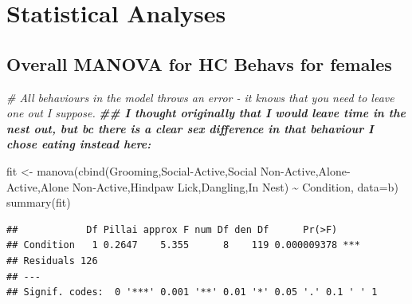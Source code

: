 \documentclass[
]{book}
\newenvironment{Shaded}{\begin{snugshade}}{\end{snugshade}}
\newcommand{\AttributeTok}[1]{\textcolor[rgb]{0.77,0.63,0.00}{#1}}
\newcommand{\CommentTok}[1]{\textcolor[rgb]{0.56,0.35,0.01}{\textit{#1}}}
\newcommand{\DocumentationTok}[1]{\textcolor[rgb]{0.56,0.35,0.01}{\textbf{\textit{#1}}}}
\newcommand{\FunctionTok}[1]{\textcolor[rgb]{0.00,0.00,0.00}{#1}}
\newcommand{\NormalTok}[1]{#1}
\newcommand{\OtherTok}[1]{\textcolor[rgb]{0.56,0.35,0.01}{#1}}
\newcommand{\SpecialCharTok}[1]{\textcolor[rgb]{0.00,0.00,0.00}{#1}}
\newcommand{\StringTok}[1]{\textcolor[rgb]{0.31,0.60,0.02}{#1}}
\begin{document}
\hypertarget{statistical-analyses-1}{%
\section*{Statistical Analyses}\label{statistical-analyses-1}}

\hypertarget{overall-manova-for-hc-behavs-for-females}{%
\subsection{Overall MANOVA for HC Behavs for females}\label{overall-manova-for-hc-behavs-for-females}}

\begin{Shaded}
\begin{Highlighting}[]
\CommentTok{\# All behaviours in the model throws an error {-} it knows that you need to leave one out I suppose. }
\DocumentationTok{\#\# I thought originally that I would leave time in the nest out, but bc there is a clear sex difference in that behaviour I chose eating instead here: }

\NormalTok{fit }\OtherTok{\textless{}{-}} \FunctionTok{manova}\NormalTok{(}\FunctionTok{cbind}\NormalTok{(Grooming,}\StringTok{\textasciigrave{}}\AttributeTok{Social{-}Active}\StringTok{\textasciigrave{}}\NormalTok{,}\StringTok{\textasciigrave{}}\AttributeTok{Social Non{-}Active}\StringTok{\textasciigrave{}}\NormalTok{,}\StringTok{\textasciigrave{}}\AttributeTok{Alone{-}Active}\StringTok{\textasciigrave{}}\NormalTok{,}\StringTok{\textasciigrave{}}\AttributeTok{Alone Non{-}Active}\StringTok{\textasciigrave{}}\NormalTok{,}\StringTok{\textasciigrave{}}\AttributeTok{Hindpaw Lick}\StringTok{\textasciigrave{}}\NormalTok{,}\StringTok{\textasciigrave{}}\AttributeTok{Dangling}\StringTok{\textasciigrave{}}\NormalTok{,}\StringTok{\textasciigrave{}}\AttributeTok{In Nest}\StringTok{\textasciigrave{}}\NormalTok{) }\SpecialCharTok{\textasciitilde{}}\NormalTok{ Condition, }\AttributeTok{data=}\NormalTok{b)}
\FunctionTok{summary}\NormalTok{(fit)}
\end{Highlighting}
\end{Shaded}

\begin{verbatim}
##            Df Pillai approx F num Df den Df      Pr(>F)    
## Condition   1 0.2647    5.355      8    119 0.000009378 ***
## Residuals 126                                              
## ---
## Signif. codes:  0 '***' 0.001 '**' 0.01 '*' 0.05 '.' 0.1 ' ' 1
\end{verbatim}
\end{document}
